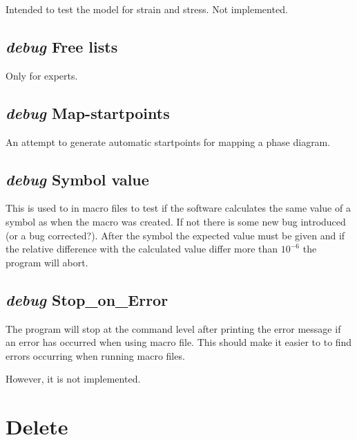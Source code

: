 \documentclass[11pt]{article}
\begin{document}
Intended to test the model for strain and stress.  Not implemented.

\hypertarget{Debug free_lists}{}
\subsection{{\em debug} Free lists}

Only for experts.

\hypertarget{Debug map_startpoints}{}
\subsection{{\em debug} Map-startpoints}

An attempt to generate automatic startpoints for mapping a phase diagram.

\hypertarget{Debug symbol value}{}
\subsection{{\em debug} Symbol value}

This is used to in macro files to test if the software calculates the
same value of a symbol as when the macro was created.  If not there is
some new bug introduced (or a bug corrected?).  After the symbol the
expected value must be given and if the relative difference with the
calculated value differ more than $10^{-6}$ the program will abort.

\hypertarget{Debug stop-on-error}{}
\subsection{{\em debug} Stop\_on\_Error}

The program will stop at the command level after printing the error
message if an error has occurred when using macro file.  This should
make it easier to to find errors occurring when running macro files.

However, it is not implemented.

\hypertarget{Delete}{}
\section{Delete }
\end{document}
